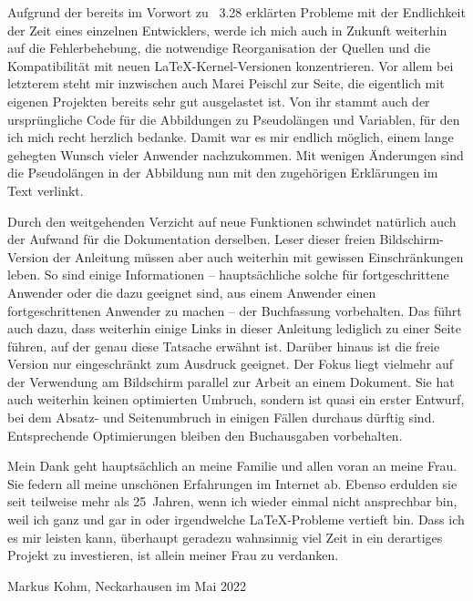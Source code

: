 Aufgrund der bereits im Vorwort zu \KOMAScript~3.28 erklärten Probleme mit der
Endlichkeit der Zeit eines einzelnen Entwicklers, werde ich mich auch in
Zukunft weiterhin auf die Fehlerbehebung, die notwendige Reorganisation der
Quellen und die Kompatibilität mit neuen \LaTeX-Kernel-Versionen
konzentrieren. Vor allem bei letzterem steht mir inzwischen auch Marei
Peischl zur Seite, die eigentlich mit eigenen Projekten bereits sehr gut
ausgelastet ist. Von ihr stammt auch der ursprüngliche Code für die
Abbildungen zu Pseudolängen und Variablen, für den ich mich recht herzlich
bedanke. Damit war es mir endlich möglich, einem lange gehegten Wunsch vieler
Anwender nachzukommen. Mit wenigen Änderungen sind die Pseudolängen in der
Abbildung nun mit den zugehörigen Erklärungen im Text verlinkt.

Durch den weitgehenden Verzicht auf neue Funktionen schwindet natürlich auch
der Aufwand für die Dokumentation derselben. Leser dieser freien
Bildschirm-Version der Anleitung müssen aber auch weiterhin mit gewissen
Einschränkungen leben. So sind einige Informationen -- hauptsächliche solche
für fortgeschrittene Anwender oder die dazu geeignet sind, aus einem Anwender
einen fortgeschrittenen Anwender zu machen -- der Buchfassung vorbehalten. Das
führt auch dazu, dass weiterhin einige Links in dieser Anleitung lediglich zu
einer Seite führen, auf der genau diese Tatsache erwähnt ist. Darüber hinaus
ist die freie Version nur eingeschränkt zum Ausdruck geeignet. Der Fokus liegt
vielmehr auf der Verwendung am Bildschirm parallel zur Arbeit an einem
Dokument. Sie hat auch weiterhin keinen optimierten Umbruch, sondern ist quasi
ein erster Entwurf, bei dem Absatz- und Seitenumbruch in einigen Fällen
durchaus dürftig sind. Entsprechende Optimierungen bleiben den Buchausgaben
vorbehalten.

Mein Dank geht hauptsächlich an meine Familie und allen voran an meine
Frau. Sie federn all meine unschönen Erfahrungen im Internet ab. Ebenso
erdulden sie seit teilweise mehr als 25~Jahren, wenn ich wieder einmal nicht
ansprechbar bin, weil ich ganz und gar in \KOMAScript{} oder irgendwelche
\LaTeX-Probleme vertieft bin. Dass ich es mir leisten kann, überhaupt geradezu
wahnsinnig viel Zeit in ein derartiges Projekt zu investieren, ist allein
meiner Frau zu verdanken.

\bigskip\noindent
Markus Kohm, Neckarhausen im Mai 2022
\endinput


